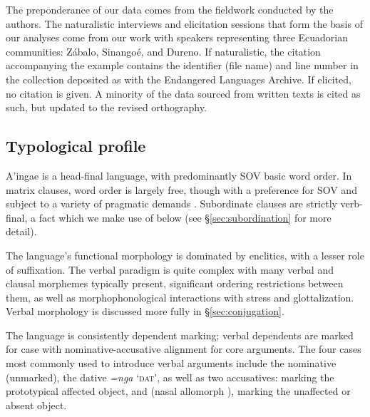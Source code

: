 \documentclass[output=paper,colorlinks,citecolor=brown]{langscibook}
\begin{document}
The preponderance of our data comes from the fieldwork conducted by the authors. The naturalistic interviews and elicitation sessions that form the basis of our analyses come from our work with speakers representing three Ecuadorian communities: Zábalo, Sinango\'e, and Du\-re\-no. If naturalistic, the citation accompanying the example contains the identifier (file name) and line number in the collection deposited as \citet{anderboissilva2018collection} with the Endangered Languages Archive. If elicited, no citation is given. A minority of the data sourced from written texts is cited as such, but updated to the revised orthography.




\subsection{Typological profile} \label{sec:typology}

A'ingae is a head-final language, with predominantly SOV basic word order. In matrix clauses, word order is largely free, though with a preference for SOV and subject to a variety of pragmatic demands \citep{fischerhengeveld}. Subordinate clauses are strictly verb-final, a fact which we make use of below (see \S\ref{sec:subordination} for more detail). 

The language's functional morphology is dominated by enclitics, with a lesser role of suffixation. The verbal paradigm is quite complex with many verbal and clausal morphemes typically present, significant ordering restrictions between them, as well as morphophonological interactions with stress and glottalization.
Verbal morphology is discussed more fully in \S\ref{sec:conjugation}.

The language is consistently dependent marking; verbal dependents are mark\-ed for case with nominative-accusative alignment for core arguments. The four cases most commonly used to introduce verbal arguments include the nominative (unmarked), the dative \emph{=nga} `\textsc{dat}', as well as two accusatives:  marking the prototypical affected object, and  (nasal allomorph ), marking the unaffected or absent object.
\end{document}
